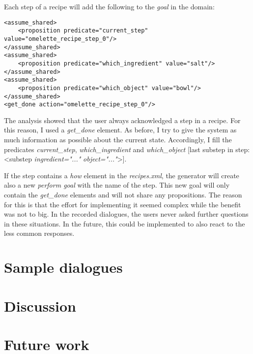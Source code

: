 \documentclass[
	11pt, %
]{fphw}
\begin{document}
Each step of a recipe will add the following to the \emph{goal} in the domain:
\begin{lstlisting}[caption={Step of a recipe},captionpos=b]
<assume_shared>
    <proposition predicate="current_step" value="omelette_recipe_step_0"/>
</assume_shared>
<assume_shared>
    <proposition predicate="which_ingredient" value="salt"/>
</assume_shared>
<assume_shared>
    <proposition predicate="which_object" value="bowl"/>
</assume_shared>
<get_done action="omelette_recipe_step_0"/>
\end{lstlisting}

The analysis showed that the user always acknowledged a step in a recipe. For this reason, I used a \emph{get\_done} element. As before, I try to give the system as much information as possible about the current state. Accordingly, I fill the predicates \emph{current\_step}, \emph{which\_ingredient} and \emph{which\_object} [last substep in step: <substep \emph{ingredient="..."} \emph{object="..."}>].

If the step contains a \emph{how} element in the \emph{recipes.xml}, the generator will create also a new \emph{perform goal} with the name of the step. This new goal will only contain the \emph{get\_done} elements and will not share any propositions. The reason for this is that the effort for implementing it seemed complex while the benefit was not to big. In the recorded dialogues, the users never asked further questions in these situations. In the future, this could be implemented to also react to the less common responses.



\section*{Sample dialogues}

\section*{Discussion}

\section*{Future work}
\end{document}
